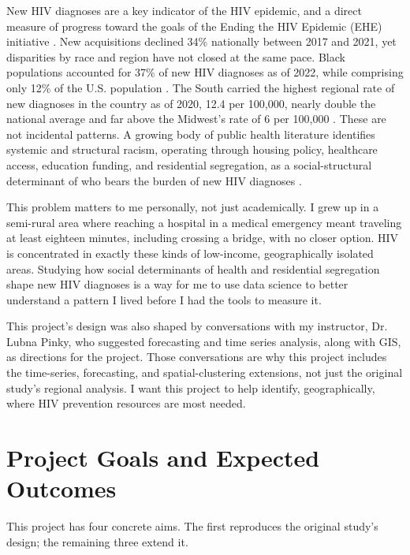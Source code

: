 \documentclass[11pt,letterpaper]{article}
\begin{document}
New HIV diagnoses are a key indicator of the HIV epidemic, and a direct measure of progress toward the goals of the Ending the HIV Epidemic (EHE) initiative \cite{cdc_ehe}. New acquisitions declined 34\% nationally between 2017 and 2021, yet disparities by race and region have not closed at the same pace. Black populations accounted for 37\% of new HIV diagnoses as of 2022, while comprising only 12\% of the U.S. population \cite{cdc_race_ethnicity}. The South carried the highest regional rate of new diagnoses in the country as of 2020, 12.4 per 100,000, nearly double the national average and far above the Midwest's rate of 6 per 100,000 \cite{cdc_hiv_by_region, hivgov_stats}. These are not incidental patterns. A growing body of public health literature identifies systemic and structural racism, operating through housing policy, healthcare access, education funding, and residential segregation, as a social-structural determinant of who bears the burden of new HIV diagnoses \cite{burton2023, braveman2022, bowleg2022, muno2024}.

This problem matters to me personally, not just academically. I grew up in a semi-rural area where reaching a hospital in a medical emergency meant traveling at least eighteen minutes, including crossing a bridge, with no closer option. HIV is concentrated in exactly these kinds of low-income, geographically isolated areas. Studying how social determinants of health and residential segregation shape new HIV diagnoses is a way for me to use data science to better understand a pattern I lived before I had the tools to measure it.

This project's design was also shaped by conversations with my instructor, Dr. Lubna Pinky, who suggested forecasting and time series analysis, along with GIS, as directions for the project. Those conversations are why this project includes the time-series, forecasting, and spatial-clustering extensions, not just the original study's regional analysis. I want this project to help identify, geographically, where HIV prevention resources are most needed.

\section{Project Goals and Expected Outcomes}

This project has four concrete aims. The first reproduces the original study's design; the remaining three extend it.
\end{document}

